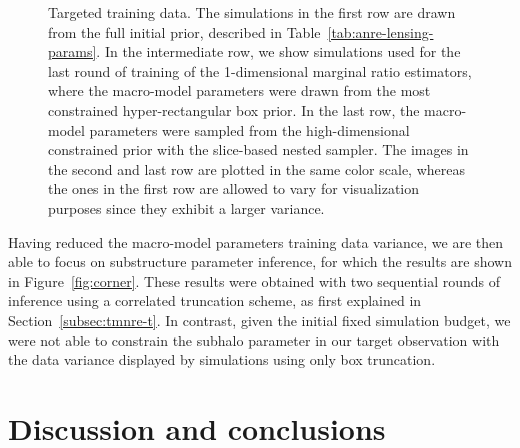 \begin{figure}
\centering
{}
\caption{Targeted training data. The simulations in the first row are drawn from the full initial prior, described in Table~\ref{tab:anre-lensing-params}. In the intermediate row, we show simulations used for the last round of training of the 1-dimensional marginal ratio estimators, where the macro-model parameters were drawn from the most constrained hyper-rectangular box prior. In the last row, the macro-model parameters were sampled from the high-dimensional constrained prior with the slice-based nested sampler. The images in the second and last row are plotted in the same color scale, whereas the ones in the first row are allowed to vary for visualization purposes since they exhibit a larger variance.
}
\label{fig:targeted_data}
\end{figure}

Having reduced the macro-model parameters training data variance, we are then able to focus on substructure parameter inference, for which the results are shown in Figure~\ref{fig:corner}. These results were obtained with two sequential rounds of inference using a correlated truncation scheme, as first explained in Section~\ref{subsec:tmnre-t}. In contrast, given the initial fixed simulation budget, we were not able to constrain the subhalo parameter in our target observation with the data variance displayed by simulations using only box truncation. 


\section{Discussion and conclusions} \label{sec:anre-conclusion}

